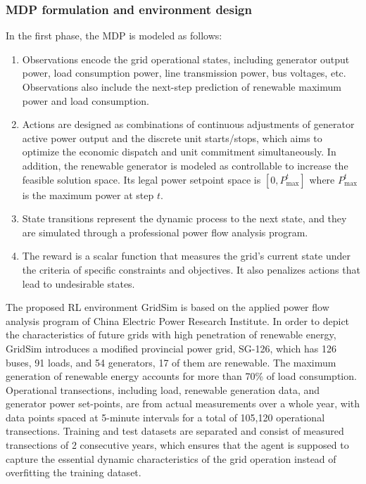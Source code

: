 \subsubsection*{MDP formulation and environment design}
In the first phase, 
the MDP is modeled as follows:
\begin{enumerate}[label=(\arabic*)]
    \item Observations encode the grid operational states, including generator output power, load consumption power, line transmission power, bus voltages, etc. Observations also include the next-step prediction of renewable maximum power and load consumption.
    \item Actions are designed as combinations of continuous adjustments of generator active power output and the discrete unit starts/stops, which aims to optimize the economic dispatch and unit commitment simultaneously. In addition, the renewable generator is modeled as controllable to increase the feasible solution space. Its legal power setpoint space is $[0, P_{\text{max}}^t]$ where $P_{\text{max}}^t$ is the maximum power at step $t$. 
    \item State transitions represent the dynamic process to the next state, and they are  simulated through a professional power flow analysis program. 
    \item The reward is a scalar function that measures the grid's current state under the criteria of specific constraints and objectives. It also penalizes actions that lead to undesirable states.
\end{enumerate}

The proposed RL environment GridSim is based on the applied power flow analysis program of China Electric Power Research Institute. In order to depict the characteristics of future grids with high penetration of renewable energy, GridSim introduces a modified provincial power grid, SG-126, which has 126 buses, 91 loads, and 54 generators, 17 of them are renewable. The maximum generation of renewable energy accounts for more than 70\% of load consumption. Operational transections, including load, renewable generation data, and generator power set-points, are from actual measurements over a whole year, with data points spaced at 5-minute intervals for a total of 105,120 operational transections. Training and test datasets are separated and consist of measured transections of 2 consecutive years, which ensures that the agent is supposed to capture the essential dynamic characteristics of the grid operation instead of overfitting the training dataset. 


